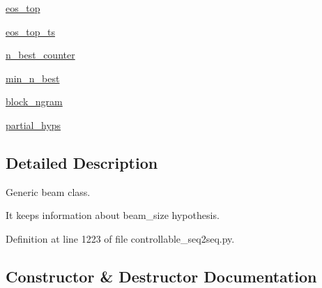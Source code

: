 \begin{DoxyCompactItemize}
\item 
\hyperlink{classprojects_1_1controllable__dialogue_1_1controllable__seq2seq_1_1controllable__seq2seq_1_1Beam_a573e769dffdbb74a1861abccd82acc34}{eos\+\_\+top}
\item 
\hyperlink{classprojects_1_1controllable__dialogue_1_1controllable__seq2seq_1_1controllable__seq2seq_1_1Beam_a68801372f27ac9fe8663322114a5f016}{eos\+\_\+top\+\_\+ts}
\item 
\hyperlink{classprojects_1_1controllable__dialogue_1_1controllable__seq2seq_1_1controllable__seq2seq_1_1Beam_af76a4cb47c1e4b9dc267f34821ab81d9}{n\+\_\+best\+\_\+counter}
\item 
\hyperlink{classprojects_1_1controllable__dialogue_1_1controllable__seq2seq_1_1controllable__seq2seq_1_1Beam_ad715f2d5f641843da30a95933c522384}{min\+\_\+n\+\_\+best}
\item 
\hyperlink{classprojects_1_1controllable__dialogue_1_1controllable__seq2seq_1_1controllable__seq2seq_1_1Beam_a6f281e607c65ed2d1ba434f64d6577d9}{block\+\_\+ngram}
\item 
\hyperlink{classprojects_1_1controllable__dialogue_1_1controllable__seq2seq_1_1controllable__seq2seq_1_1Beam_a58867f3a37a03b4d8904b09035352534}{partial\+\_\+hyps}
\end{DoxyCompactItemize}


\subsection{Detailed Description}
\begin{DoxyVerb}Generic beam class.

It keeps information about beam_size hypothesis.
\end{DoxyVerb}
 

Definition at line 1223 of file controllable\+\_\+seq2seq.\+py.



\subsection{Constructor \& Destructor Documentation}
\mbox{\label{classprojects_1_1controllable__dialogue_1_1controllable__seq2seq_1_1controllable__seq2seq_1_1Beam_ad750b2491841b08785706eb6e8fff097}} 
